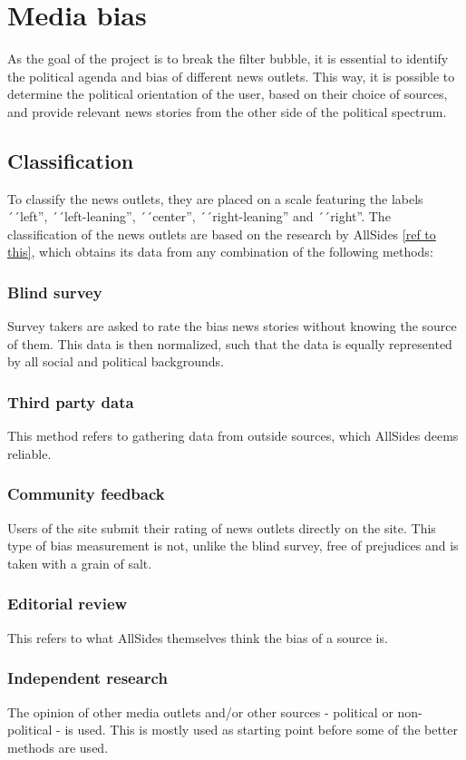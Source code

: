 \section{Media bias} \label{sec:mediabias}
As the goal of the project is to break the filter bubble, it is essential to
identify the political agenda and bias of different news outlets. This way, it
is possible to determine the political orientation of the user, based on their
choice of sources, and provide relevant news stories from the other side of the
political spectrum.
\subsection{Classification}
To classify the news outlets, they are placed on a scale featuring the labels
´´left'', ´´left-leaning'', ´´center'', ´´right-leaning'' and ´´right''.
The classification of the news outlets are based on the research by AllSides
\ref{ref to this}, which obtains its data from any combination of the following
methods:
\subsubsection*{Blind survey}
Survey takers are asked to rate the bias news stories without knowing the source
of them. This data is then normalized, such that the data is equally represented
by all social and political backgrounds.
\subsubsection*{Third party data}
This method refers to gathering data from outside sources, which AllSides deems
reliable.
\subsubsection*{Community feedback}
Users of the site submit their rating of news outlets directly on the site. This
type of bias measurement is not, unlike the blind survey, free of prejudices and
is taken with a grain of salt.
\subsubsection*{Editorial review}
This refers to what AllSides themselves think the bias of a source is.
\subsubsection*{Independent research}
The opinion of other media outlets and/or other sources - political or
non-political - is used. This is mostly used as starting point before some of
the better methods are used.